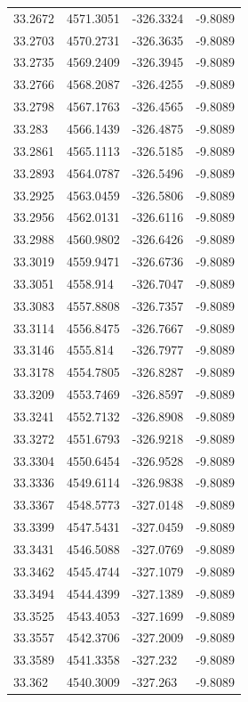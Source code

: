\begin{table}[H]
\begin{tabular}{llll}
33.2672 & 4571.3051 & -326.3324 & -9.8089 \\
33.2703 & 4570.2731 & -326.3635 & -9.8089 \\
33.2735 & 4569.2409 & -326.3945 & -9.8089 \\
33.2766 & 4568.2087 & -326.4255 & -9.8089 \\
33.2798 & 4567.1763 & -326.4565 & -9.8089 \\
33.283 & 4566.1439 & -326.4875 & -9.8089 \\
33.2861 & 4565.1113 & -326.5185 & -9.8089 \\
33.2893 & 4564.0787 & -326.5496 & -9.8089 \\
33.2925 & 4563.0459 & -326.5806 & -9.8089 \\
33.2956 & 4562.0131 & -326.6116 & -9.8089 \\
33.2988 & 4560.9802 & -326.6426 & -9.8089 \\
33.3019 & 4559.9471 & -326.6736 & -9.8089 \\
33.3051 & 4558.914 & -326.7047 & -9.8089 \\
33.3083 & 4557.8808 & -326.7357 & -9.8089 \\
33.3114 & 4556.8475 & -326.7667 & -9.8089 \\
33.3146 & 4555.814 & -326.7977 & -9.8089 \\
33.3178 & 4554.7805 & -326.8287 & -9.8089 \\
33.3209 & 4553.7469 & -326.8597 & -9.8089 \\
33.3241 & 4552.7132 & -326.8908 & -9.8089 \\
33.3272 & 4551.6793 & -326.9218 & -9.8089 \\
33.3304 & 4550.6454 & -326.9528 & -9.8089 \\
33.3336 & 4549.6114 & -326.9838 & -9.8089 \\
33.3367 & 4548.5773 & -327.0148 & -9.8089 \\
33.3399 & 4547.5431 & -327.0459 & -9.8089 \\
33.3431 & 4546.5088 & -327.0769 & -9.8089 \\
33.3462 & 4545.4744 & -327.1079 & -9.8089 \\
33.3494 & 4544.4399 & -327.1389 & -9.8089 \\
33.3525 & 4543.4053 & -327.1699 & -9.8089 \\
33.3557 & 4542.3706 & -327.2009 & -9.8089 \\
33.3589 & 4541.3358 & -327.232 & -9.8089 \\
33.362 & 4540.3009 & -327.263 & -9.8089 \\

\end{tabular}
\end{table}
